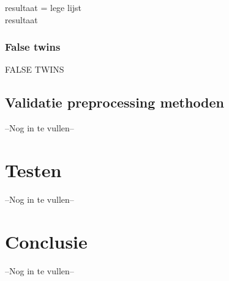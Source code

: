 \documentclass{article}
\begin{document}
\begin{algorithm}[H]
	resultaat = lege lijst\\
	\Return resultaat
\end{algorithm}

\subsubsection{False twins}
FALSE TWINS

\subsection{Validatie preprocessing methoden}
--Nog in te vullen--
\pagebreak


\section{Testen}
--Nog in te vullen--
\pagebreak


\section{Conclusie}
--Nog in te vullen--
\pagebreak
\end{document}
